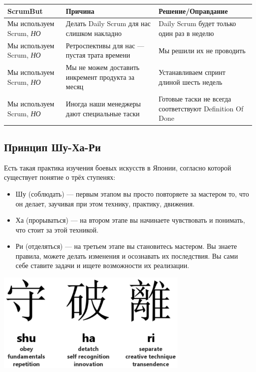 \documentclass{../../text-style}
\begin{document}
\begin{center}
    \begin{tabularx}{\textwidth} { 
        | >{\centering\arraybackslash}X 
        | >{\centering\arraybackslash}X 
        | >{\centering\arraybackslash}X | }
        \hline
        ScrumBut                       & Причина                                           & Решение/Оправдание \\
        \hline
        Мы используем Scrum, \emph{НО} & Делать Daily Scrum для нас слишком накладно       & Daily Scrum будет только один раз в неделю               \\
        \hline
        Мы используем Scrum, \emph{НО} & Ретроспективы для нас --- пустая трата времени    & Мы решили их не проводить                                \\
        \hline
        Мы используем Scrum, \emph{НО} & Мы не можем доставить инкремент продукта за месяц & Устанавливаем спринт длиной шесть недель                 \\
        \hline
        Мы используем Scrum, \emph{НО} & Иногда наши менеджеры дают специальные таски      & Готовые таски не всегда соответствуют Definition Of Done \\
        \hline
    \end{tabularx}
\end{center}

\subsection{Принцип Шу-Ха-Ри}

Есть такая практика изучения боевых искусств в Японии, согласно которой существует понятие о трёх ступенях:

\begin{itemize}
    \item Шу (соблюдать) --- первым этапом вы просто повторяете за мастером то, что он делает, заучивая при этом технику, практику, движения.
    \item Ха (прорываться) --- на втором этапе вы начинаете чувствовать и понимать, что стоит за этой техникой.
    \item Ри (отделяться) --- на третьем этапе вы становитесь мастером. Вы знаете правила, можете делать изменения и осознавать их последствия. Вы сами себе ставите задачи и ищете возможности их реализации.
\end{itemize}

\begin{center}
    \includegraphics[width=0.7\textwidth]{shuHaRi.png}
\end{center}
\end{document}
